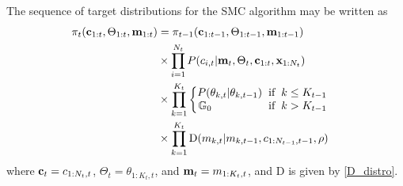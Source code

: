 \documentclass[twocolumn, final]{svjour3}
\begin{document}
The sequence of target distributions for the SMC algorithm may be written as
\begin{equation}
\begin{split}
\pi_{t}(\bold{c}_{1:t}, \Theta_{1:t}, \bold{m}_{1:t}) & =  \pi_{t-1}(\bold{c}_{1:t-1}, \Theta_{1:t-1}, \bold{m}_{1:t-1})\\
& \times \prod_{i=1}^{N_{t}} P(c_{i,t} | \bold{m}_{t}, \Theta_{t}, \bold{c}_{1:t}, \bold{x}_{1:N_{t}}) \\
& \times \prod_{k=1}^{K_{t}} 
\begin{cases}
\begin{split}
P(\theta_{k,t} | \theta_{k,t-1}) \hspace{2mm} & \text{if} \hspace{2mm} k \leq K_{t-1} \\
\mathbb{G}_{0} \hspace{18mm} & \text{if} \hspace{2mm} k > K_{t-1}
\end{split}
\end{cases} \\
& \times \prod_{k=1}^{K_{t}} \text{D}(m_{k,t} | m_{k,t-1}, c_{1:N_{t-1}, t-1}, \rho)
\end{split}
\end{equation}
where $\bold{c}_{t} = c_{1:N_{t},t}$, $\Theta_{t} = \theta_{1:K_{t},t}$, and $\bold{m}_{t} = m_{1:K_{t},t} $, and D is given by \eqref{D_distro}.
\end{document}
